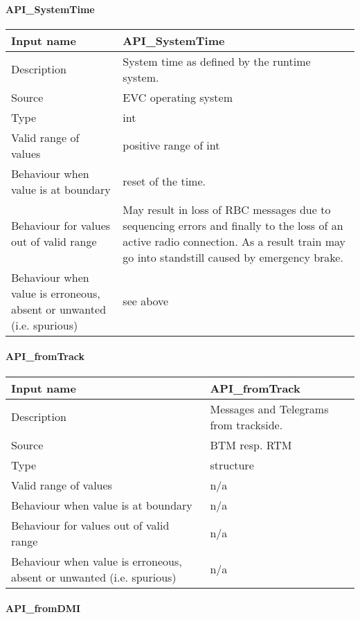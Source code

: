 \paragraph{API\_SystemTime}

\begin{longtable}{p{}p{}}
\toprule
Input name				& API\_SystemTime \\
\midrule
Description				& System time as defined by the runtime system. \\
\midrule
Source					& EVC operating system  \\ 
\midrule
Type					& int \\
\midrule
Valid range of values	& positive range of int\\
\midrule
Behaviour when value is at boundary	& reset of the time. \\
\midrule
Behaviour for values out of valid range	& May result in loss of RBC messages due to sequencing errors and finally to the loss of an active radio connection. As a result train may go into standstill caused by emergency brake. \\
\midrule
Behaviour when value is erroneous, absent or unwanted (i.e. spurious) & see above \\
\bottomrule
\end{longtable}

\paragraph{API\_fromTrack}

\begin{longtable}{p{}p{}}
\toprule
Input name				& API\_fromTrack \\
\midrule
Description				& Messages and Telegrams from trackside. \\
\midrule
Source					& BTM resp. RTM\\ 
\midrule
Type					& structure \\
\midrule
Valid range of values	& n/a \\
\midrule
Behaviour when value is at boundary	& n/a \\
\midrule
Behaviour for values out of valid range	& n/a \\
\midrule
Behaviour when value is erroneous, absent or unwanted (i.e. spurious) & n/a \\
\bottomrule
\end{longtable}

\paragraph{API\_fromDMI}

